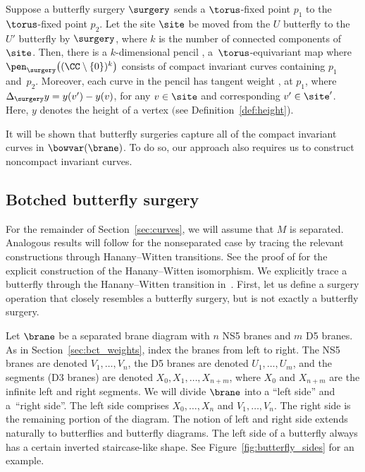 \begin{Lemma} \label{lemma:butterfly_surgery}
Suppose a butterfly surgery $\surgery$ sends a $\torus$-fixed point $p_1$ to the $\torus$-fixed point $p_2$. Let the site $\site$ be moved from the $U$ butterfly to the $U'$ butterfly by $\surgery$, where $k$ is the number of connected components of $\site$. Then, there is a $k$-dimensional pencil , a~$\torus$-equ\-ivariant map where $\pen_\surgery\bigl((\CC\setminus\{0\})^k\bigr)$ consists of compact invariant curves containing $p_1$ and~$p_2$. Moreover, each curve in the pencil has tangent weight
,
at $p_1$, where
$
\Delta_\surgery y = y(v') - y(v)$,
for any $v\in\site$ and corresponding $v'\in\site'$. Here, $y$ denotes the height of a vertex $($see Definition~{\rm\ref{def:height})}.
\end{Lemma}

It will be shown that butterfly surgeries capture all of the compact invariant curves in $\bowvar(\brane)$. To do so, our approach also requires us to construct noncompact invariant curves.

\subsection{Botched butterfly surgery} \label{sec:botched_surgery}
For the remainder of Section~\ref{sec:curves}, we will assume that $M$ is separated. Analogous results will follow for the nonseparated case by tracing the relevant constructions through Hanany--Witten transitions. See the proof of \cite[Proposition~8.1]{NT} for the explicit construction of the Hanany--Witten isomorphism. We explicitly trace a butterfly through the Hanany--Witten transition in~\cite[Section~3.2.4]{S}. First, let us define a surgery operation that closely resembles a butterfly surgery, but is not exactly a butterfly surgery.

Let $\brane$ be a separated brane diagram with $n$ NS5 branes and $m$ D5 branes. As in Section~\ref{sec:bct_weights}, index the branes from left to right. The NS5 branes are denoted $V_1, \dots , V_n$, the D5 branes are denoted $U_1, \dots , U_m$, and the segments (D3 branes) are denoted $X_0, X_1, \dots , X_{n+m}$, where $X_0$ and $X_{n+m}$ are the infinite left and right segments. We will divide $\brane$ into a ``left side'' and a~``right side''. The left side comprises $X_0, \dots , X_n$ and $V_1, \dots , V_n$. The right side is the remaining portion of the diagram. The notion of left and right side extends naturally to butterflies and butterfly diagrams. The left side of a butterfly always has a certain inverted staircase-like shape. See Figure~\ref{fig:butterfly_sides} for an example.

